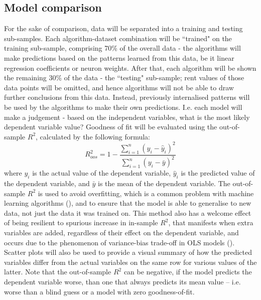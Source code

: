\documentclass[12pt]{report}
\begin{document}
\subsection{Model comparison}
For the sake of comparison, data will be separated into a training and testing sub-samples. Each algorithm-dataset combination will be ``trained" on the training sub-sample, comprising 70\% of the overall data - the algorithms will make predictions based on the patterns learned from this data, be it linear regression coefficients or neuron weights. After that, each algorithm will be shown the remaining 30\% of the data - the ``testing" sub-sample; rent values of those data points will be omitted, and hence algorithms will not be able to draw further conclusions from this data. Instead, previously internalised patterns will be used by the algorithms to make their own predictions. I.e. each model will make a judgement - based on the independent variables, what is the most likely dependent variable value? Goodness of fit will be evaluated using the out-of-sample $R^2$, calculated by the following formula:
\begin{equation}
	R^2_{oos} = 1 - \frac{\sum_{i=1}^{n}(y_i - \hat{y}_i)^2}{\sum_{i=1}^{n}(y_i - \bar{y})^2}
\end{equation}
where $y_i$ is the actual value of the dependent variable, $\hat{y}_i$ is the predicted value of the dependent variable, and $\bar{y}$ is the mean of the dependent variable. The out-of-sample $R^2$ is used to avoid overfitting, which is a common problem with machine learning algorithms (\cite[p. 2]{hawinkel2023}), and to ensure that the model is able to generalise to new data, not just the data it was trained on. This method also has a welcome effect of being resilient to spurious increase in in-sample $R^2$, that manifests when extra variables are added, regardless of their effect on the dependent variable, and occurs due to the phenomenon of variance-bias trade-off in OLS models (\cite{dalpiaz2021}). Scatter plots will also be used to provide a visual summary of how the predicted variables differ from the actual variables on the same row for various values of the latter. Note that the out-of-sample $R^2$ can be negative, if the model predicts the dependent variable worse, than one that always predicts its mean value -- i.e. worse than a blind guess or a model with zero goodness-of-fit.
\end{document}
